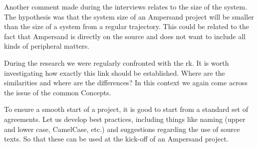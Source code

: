 Another comment made during the interviews relates to the size of the system.
The hypothesis was that the system size of an Ampersand project will be smaller than the size of a system from a regular trajectory.
This could be related to the fact that Ampersand is directly on the source and does not want to include all kinds of peripheral matters.

During the research we were regularly confronted with the \acrshort{rk}.
It is worth investigating how exactly this link should be established.
Where are the similarities and where are the differences?
In this context we again come across the issue of the common Concepts.

To ensure a smooth start of a project, it is good to start from a standard set of agreements.
Let us develop best practices, including things like naming (upper and lower case, CamelCase, etc.) and suggestions regarding the use of source texts.
So that these can be used at the kick-off of an Ampersand project.

